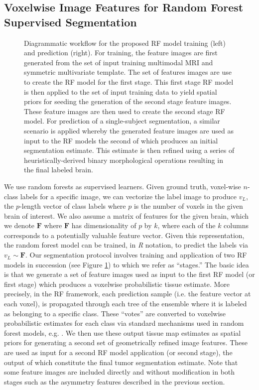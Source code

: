 \subsection{Voxelwise Image Features for Random Forest Supervised Segmentation}

\begin{figure}
  \centering
   \vspace{-15mm}
  \caption{Diagrammatic workflow for the proposed RF model training (left) and prediction
  (right).  For training, the feature images are first generated from the set of input 
  training multimodal MRI and symmetric multivariate template. The set of features images are 
  use to create the RF model for the first stage.  This first stage RF model is then applied
  to the set of input training data to yield spatial priors for seeding the generation of the
  second stage feature images.  These feature images are then used to create the second
  stage RF model.  For prediction of a single-subject segmentation, a similar scenario 
  is applied whereby the generated feature images are used as input to the RF models the
  second of which produces an initial segmentation estimate.  This estimate is then refined
  using a series of heuristically-derived binary morphological operations resulting in the 
  final labeled brain.
  }
  \label{fig:pipeline}
\end{figure}

We use random forests as supervised learners.  Given ground truth,
voxel-wise $n$-class labels for a specific image, we can vectorize the
label image to produce $v_L$, the $p$-length vector of class labels
where $p$ is the number of voxels in the given brain of interest.
We also assume a matrix of features for the given brain, which we
denote $\bm{F}$ where $\bm{F}$ has dimensionality of $p$ by
$k$, where each of the $k$ columns corresponds to a potentially valuable
feature vector.  Given this representation, the random forest model
can be trained, in \textit{R} notation, to predict the labels via
$v_L \sim  \bm{F}$.
Our segmentation protocol involves training and application
of two RF models in succession 
(see Figure \ref{fig:pipeline}) to which we refer as ``stages.''  The basic idea is that
we generate a set of feature images used as input to the
first RF model (or first stage) which produces a voxelwise 
probabilistic tissue estimate.  More precisely, in the RF framework, each prediction sample (i.e. the feature vector at each voxel),
is propagated through each tree of the ensemble where it is labeled as belonging to a specific
class.  
These ``votes'' are converted to voxelwise probabilistic
estimates for each class via standard mechanisms used in random forest
models, e.g. \cite{liaw2002}.
We then use these output tissue map estimates as spatial 
priors for generating a second set of geometrically refined image features.  These
are used as input for a second RF model application (or
second stage),
the output of which constitute the final tumor segmentation estimate.
Note that some feature images are included directly and
  without modification in both stages such as
the asymmetry features described in the previous section.


